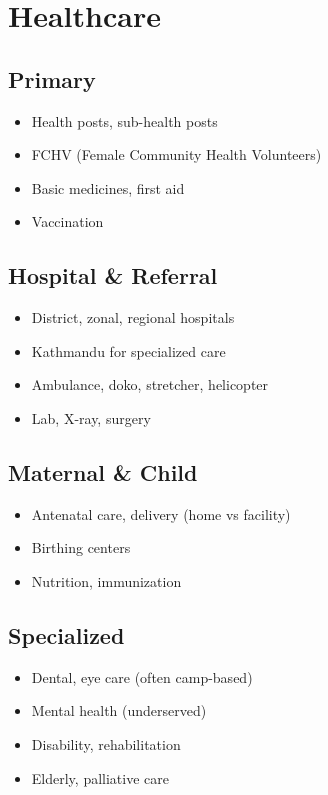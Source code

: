 \documentclass[11pt,a4paper]{article}
\begin{document}
\section{Healthcare}

\subsection{Primary}
\begin{itemize}
    \item Health posts, sub-health posts
    \item FCHV (Female Community Health Volunteers)
    \item Basic medicines, first aid
    \item Vaccination
\end{itemize}

\subsection{Hospital \& Referral}
\begin{itemize}
    \item District, zonal, regional hospitals
    \item Kathmandu for specialized care
    \item Ambulance, doko, stretcher, helicopter
    \item Lab, X-ray, surgery
\end{itemize}

\subsection{Maternal \& Child}
\begin{itemize}
    \item Antenatal care, delivery (home vs facility)
    \item Birthing centers
    \item Nutrition, immunization
\end{itemize}

\subsection{Specialized}
\begin{itemize}
    \item Dental, eye care (often camp-based)
    \item Mental health (underserved)
    \item Disability, rehabilitation
    \item Elderly, palliative care
\end{itemize}
\end{document}

